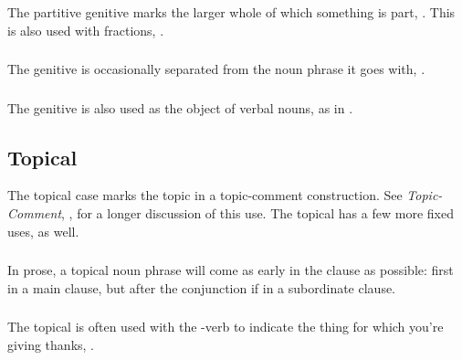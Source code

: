 \subsubsection{} The partitive genitive marks the larger whole of
which something is part,  .  This is also used with fractions,  . 
\label{syn:partitive-gen}

\subsubsection{} The genitive is occasionally separated from the noun
phrase it goes with,  .

\subsubsection{} The genitive is also used as the object of verbal
nouns, as in  .

\subsection{Topical} The topical case marks the topic in a
topic-comment construction.  See \textit{Topic-Comment},
, for a longer discussion of this use.
The topical has a few more fixed uses, as well.

\subsubsection{} In prose, a topical noun phrase will come as early in
the clause as possible: first in a main clause, but after the
conjunction if in a subordinate clause. 
\label{syn!topical!word-order}

\subsubsection{} The topical is often used with the -verb
  to indicate the thing for which you're
giving thanks, 
.

